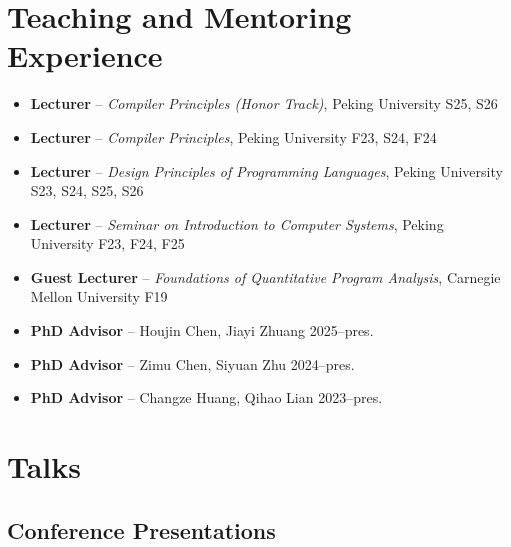 \documentclass[11pt,letterpaper,sans]{moderncv}
\begin{document}
\section{Teaching and Mentoring Experience}

\begin{itemize}
  \item \textbf{Lecturer} -- \emph{Compiler Principles (Honor Track)}, Peking University \hfill S25, S26
  \item \textbf{Lecturer} -- \emph{Compiler Principles}, Peking University \hfill F23, S24, F24
  \item \textbf{Lecturer} -- \emph{Design Principles of Programming Languages}, Peking University \hfill S23, S24, S25, S26
  \item \textbf{Lecturer} -- \emph{Seminar on Introduction to Computer Systems}, Peking University \hfill F23, F24, F25
  \item \textbf{Guest Lecturer} -- \emph{Foundations of Quantitative Program Analysis}, Carnegie Mellon University \hfill F19

  \vspace{4pt}

  \item \textbf{PhD Advisor} -- Houjin Chen, Jiayi Zhuang \hfill 2025--pres.
  \item \textbf{PhD Advisor} -- Zimu Chen, Siyuan Zhu \hfill 2024--pres.
  \item \textbf{PhD Advisor} -- Changze Huang, Qihao Lian \hfill 2023--pres.
\end{itemize}

\section{Talks}

\subsection{Conference Presentations}
\end{document}
